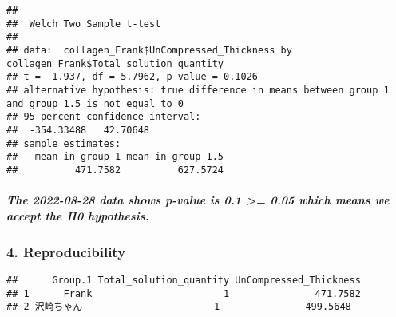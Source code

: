 \documentclass[
]{article}
\newenvironment{Shaded}{\begin{snugshade}}{\end{snugshade}}
\newcommand{\FunctionTok}[1]{\textcolor[rgb]{0.00,0.00,0.00}{#1}}
\newcommand{\NormalTok}[1]{#1}
\newcommand{\OtherTok}[1]{\textcolor[rgb]{0.56,0.35,0.01}{#1}}
\newcommand{\SpecialCharTok}[1]{\textcolor[rgb]{0.00,0.00,0.00}{#1}}
\begin{document}
\begin{Shaded}
\end{Shaded}

\begin{verbatim}
## 
##  Welch Two Sample t-test
## 
## data:  collagen_Frank$UnCompressed_Thickness by collagen_Frank$Total_solution_quantity
## t = -1.937, df = 5.7962, p-value = 0.1026
## alternative hypothesis: true difference in means between group 1 and group 1.5 is not equal to 0
## 95 percent confidence interval:
##  -354.33488   42.70648
## sample estimates:
##   mean in group 1 mean in group 1.5 
##          471.7582          627.5724
\end{verbatim}

\hypertarget{the-2022-08-28-data-shows-p-value-is-0.1-0.05-which-means-we-accept-the-h0-hypothesis.}{%
\subparagraph{The 2022-08-28 data shows p-value is 0.1 \textgreater=
0.05 which means we accept the H0
hypothesis.}\label{the-2022-08-28-data-shows-p-value-is-0.1-0.05-which-means-we-accept-the-h0-hypothesis.}}

\hypertarget{reproducibility}{%
\subsubsection{4. Reproducibility}\label{reproducibility}}

\begin{verbatim}
##      Group.1 Total_solution_quantity UnCompressed_Thickness
## 1      Frank                       1               471.7582
## 2 沢崎ちゃん                       1               499.5648
\end{verbatim}

\begin{Shaded}
\end{Shaded}
\end{document}
